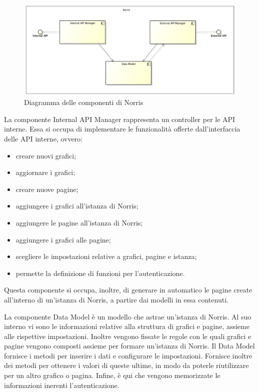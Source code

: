 
	\begin{figure}[H]\centering
        \includegraphics[width=\textwidth]{SpecificaTecnica/Pics/ComponentiNorris}
        \caption{Diagramma delle componenti di Norris}
    \end{figure}



			La componente Internal API Manager rappresenta un controller per le API interne. Essa si occupa di implementare le funzionalità offerte dall'interfaccia delle API interne, ovvero:
			\begin{itemize}
				\item creare nuovi grafici;
				\item aggiornare i grafici;
				\item creare nuove pagine;
				\item aggiungere i grafici all'istanza di Norris;
				\item aggiungere le pagine all'istanza di Norris;
				\item aggiungere i grafici alle pagine;
				\item scegliere le impostazioni relative a grafici, pagine e istanza;
				\item permette la definizione di funzioni per l'autenticazione.
			\end{itemize}
		Questa componente si occupa, inoltre, di generare in automatico le pagine create all'interno di un'istanza di Norris, a partire dai modelli in essa contenuti.

			La componente Data Model è un modello che astrae un'istanza di Norris. Al suo interno vi sono le informazioni relative alla struttura di grafici e pagine, assieme alle rispettive impostazioni. Inoltre vengono fissate le regole con le quali grafici e pagine vengono composti assieme per formare un'istanza di Norris. Il Data Model fornisce i metodi per inserire i dati e configurare le impostazioni. Fornisce inoltre dei metodi per ottenere i valori di queste ultime, in modo da poterle riutilizzare per un altro grafico o pagina. Infine, è qui che vengono memorizzate le informazioni inerenti l'autenticazione.

